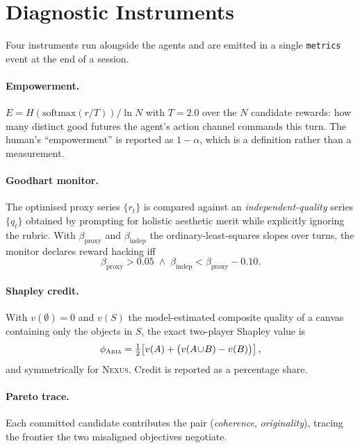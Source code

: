\documentclass[11pt]{article}
\newcommand{\code}[1]{\texttt{\small #1}}
\newcommand{\ARIA}{\textsc{Aria}}
\newcommand{\NEXUS}{\textsc{Nexus}}
\theoremstyle{plain}
\theoremstyle{definition}
\begin{document}
\section{Diagnostic Instruments}
\label{sec:instruments}
Four instruments run alongside the agents and are emitted in a single
\code{metrics} event at the end of a session.

\paragraph{Empowerment.}
$E = H(\mathrm{softmax}(r/T))/\ln N$ with $T = 2.0$ over the $N$ candidate
rewards: how many distinct good futures the agent's action channel commands this
turn. The human's ``empowerment'' is reported as $1-\alpha$, which is a
definition rather than a measurement.

\paragraph{Goodhart monitor.}
The optimised proxy series $\{r_t\}$ is compared against an
\emph{independent-quality} series $\{q_t\}$ obtained by prompting for holistic
aesthetic merit while explicitly ignoring the rubric. With
$\beta_{\text{proxy}}$ and $\beta_{\text{indep}}$ the ordinary-least-squares
slopes over turns, the monitor declares reward hacking iff
\begin{equation}
\beta_{\text{proxy}} > 0.05
\;\wedge\;
\beta_{\text{indep}} < \beta_{\text{proxy}} - 0.10 .
\label{eq:goodhart}
\end{equation}

\paragraph{Shapley credit.}
With $v(\emptyset) = 0$ and $v(S)$ the model-estimated composite quality of a
canvas containing only the objects in $S$, the exact two-player Shapley value is
\begin{equation}
\phi_{\ARIA{}} = \tfrac{1}{2}\!\left[v(A) + \big(v(A\!\cup\!B) - v(B)\big)\right],
\label{eq:shapley}
\end{equation}
and symmetrically for \NEXUS{}. Credit is reported as a percentage share.

\paragraph{Pareto trace.}
Each committed candidate contributes the pair (\emph{coherence},
\emph{originality}), tracing the frontier the two misaligned objectives
negotiate.
\end{document}
